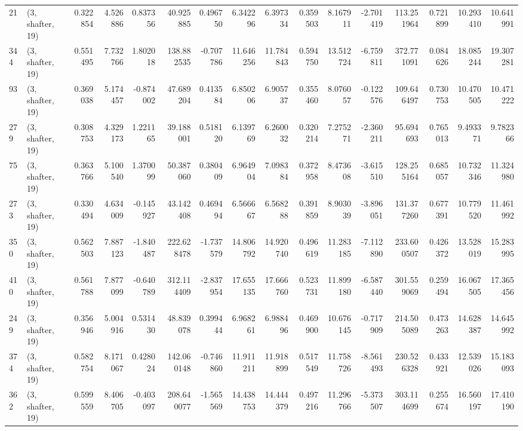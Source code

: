 \begin{tabular}{llrrrrrrrrrrrrrr}
21  &  (3, shafter, 19) &   0.322854 &   4.526886 &   0.837356 &    40.925885 &   0.496750 &   6.342296 &   6.397334 &  0.359503 &   8.167911 &  -2.701419 &   113.251964 &   0.721899 &  10.293410 &  10.641991 \\
344 &  (3, shafter, 19) &   0.551495 &   7.732766 &   1.802018 &   138.882535 &  -0.707786 &  11.646256 &  11.784843 &  0.594750 &  13.512724 &  -6.759811 &   372.771091 &   0.084626 &  18.085244 &  19.307281 \\
93  &  (3, shafter, 19) &   0.369038 &   5.174457 &  -0.874002 &    47.689204 &   0.413584 &   6.850206 &   6.905737 &  0.355460 &   8.076057 &  -0.122576 &   109.646497 &   0.730753 &  10.470505 &  10.471222 \\
279 &  (3, shafter, 19) &   0.308753 &   4.329173 &   1.221165 &    39.188001 &   0.518120 &   6.139769 &   6.260032 &  0.320214 &   7.275271 &  -2.360211 &    95.694693 &   0.765013 &   9.493371 &   9.782366 \\
75  &  (3, shafter, 19) &   0.363766 &   5.100540 &   1.370099 &    50.387060 &   0.380409 &   6.964904 &   7.098384 &  0.372958 &   8.473608 &  -3.615510 &   128.255164 &   0.685057 &  10.732346 &  11.324980 \\
273 &  (3, shafter, 19) &   0.330494 &   4.634009 &  -0.145927 &    43.142408 &   0.469494 &   6.566667 &   6.568288 &  0.391859 &   8.903039 &  -3.896051 &   131.377260 &   0.677391 &  10.779520 &  11.461992 \\
350 &  (3, shafter, 19) &   0.562503 &   7.887123 &  -1.840487 &   222.628478 &  -1.737579 &  14.806792 &  14.920740 &  0.496619 &  11.283185 &  -7.112890 &   233.600507 &   0.426372 &  13.528019 &  15.283995 \\
410 &  (3, shafter, 19) &   0.561788 &   7.877099 &  -0.640789 &   312.114409 &  -2.837954 &  17.655135 &  17.666760 &  0.523731 &  11.899180 &  -6.587440 &   301.559069 &   0.259494 &  16.067505 &  17.365456 \\
249 &  (3, shafter, 19) &   0.356946 &   5.004916 &   0.531430 &    48.839078 &   0.399444 &   6.968261 &   6.988496 &  0.469900 &  10.676145 &  -0.717909 &   214.505089 &   0.473263 &  14.628387 &  14.645992 \\
374 &  (3, shafter, 19) &   0.582754 &   8.171067 &   0.428024 &   142.060148 &  -0.746860 &  11.911211 &  11.918899 &  0.517549 &  11.758726 &  -8.561493 &   230.526328 &   0.433921 &  12.539026 &  15.183093 \\
362 &  (3, shafter, 19) &   0.599559 &   8.406705 &  -0.403097 &   208.640077 &  -1.565569 &  14.438753 &  14.444379 &  0.497216 &  11.296766 &  -5.373507 &   303.114699 &   0.255674 &  16.560197 &  17.410190 \\

\end{tabular}
